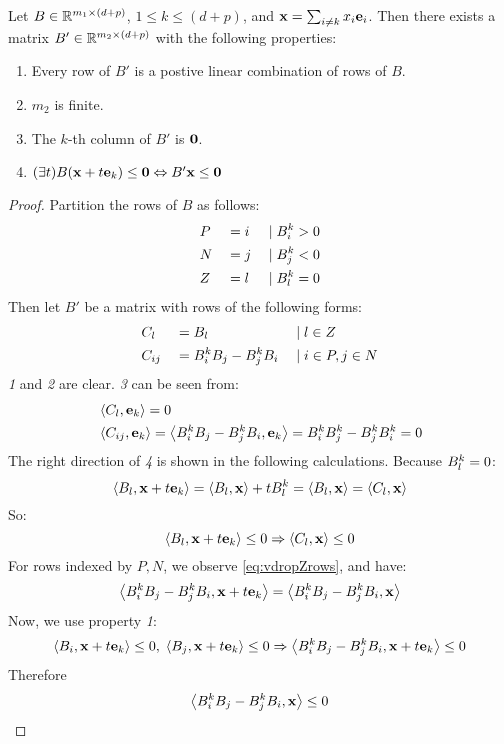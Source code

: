 \begin{Prop}{\label{prop:hconeproj}
		Let $B \in \mathbb{R}^{m_1\times (d+p)}$, $1 \leq k \leq (d+p)$, and $\mathbf{x} = \sum_{i\neq k}x_i \mathbf{e}_i$.  Then there exists a matrix $B' \in \mathbb{R}^{m_2\times (d+p)}$ with the following properties:
		\begin{enumerate}
			\item Every row of $B'$ is a postive linear combination of rows of $B$.
			\item $m_2$ is finite.
			\item The $k$-th column of $B'$ is $\mathbf{0}$.
			\item \((\exists t)B(\mathbf{x} + t\mathbf{e}_k) \leq \mathbf{0} \Leftrightarrow B'\mathbf{x} \leq \mathbf{0}\)
		\end{enumerate}
	}\end{Prop}
\begin{proof}
	Partition the rows of $B$ as follows:
	\begin{alignat*}{3}
		 & P &  & = i & \;|\; & B^k_i > 0 \\
		 & N &  & = j & \;|\; & B^k_j < 0 \\
		 & Z &  & = l & \;|\; & B^k_l = 0
	\end{alignat*}
	Then let $B'$ be a matrix with rows of the following forms:
	\begin{alignat*}{3}
		 & C_l    &  & = B_l                 & \;|\; & l \in Z          \\
		 & C_{ij} &  & = B^k_i B_j - B^k_j B_i & \;|\; & i \in P, j \in N
	\end{alignat*}
	\textit{1} and \textit{2} are clear.  \textit{3} can be seen from:
	\begin{align}
		 & \left\langle C_l, \mathbf{e}_k \right\rangle = 0 \nonumber                                                                        \\
		 & \left\langle C_{ij}, \mathbf{e}_k \right\rangle = \left\langle B^k_i B_j - B^k_j B_i, \mathbf{e}_k \right\rangle = B^k_i B^k_j - B^k_j B^k_i = 0\label{eq:vdropZrows}
	\end{align}
	The right direction of \textit{4} is shown in the following calculations.  Because $B^k_l = 0$:
	\[ \left\langle B_l, \mathbf{x}+t\mathbf{e}_k \right\rangle = \left\langle B_l, \mathbf{x} \right\rangle + tB^k_l = \left\langle B_l, \mathbf{x} \right\rangle = \left\langle C_l, \mathbf{x} \right\rangle \]
	So:
	\[ \left\langle B_l, \mathbf{x}+t\mathbf{e}_k \right\rangle \leq 0 \Rightarrow \left\langle C_l, \mathbf{x} \right\rangle \leq 0 \]
	For rows indexed by $P,N$, we observe \eqref{eq:vdropZrows}, and have:
	\[ \left\langle B^k_i B_j - B^k_j B_i, \mathbf{x} + t\mathbf{e}_k \right\rangle = \left\langle B^k_i B_j - B^k_j B_i, \mathbf{x} \right\rangle \]
	Now, we use property \textit{1}:
	\[ \left\langle B_i, \mathbf{x}+t\mathbf{e}_k \right\rangle \leq 0,\; \left\langle B_j, \mathbf{x}+t\mathbf{e}_k \right\rangle \leq 0 \Rightarrow
		\left\langle B^k_i B_j - B^k_j B_i, \mathbf{x} + t\mathbf{e}_k \right\rangle \leq 0\]
	Therefore
	\[ \left\langle B^k_i B_j - B^k_j B_i, \mathbf{x} \right\rangle \leq 0 \]


\end{proof}

